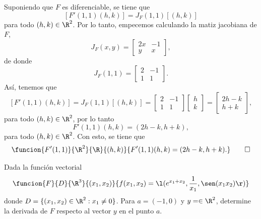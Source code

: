 \documentclass[a4,11pt]{aleph-examen}
\begin{document}
\begin{preguntas}
\begin{respuesta}
\begin{respuesta}
\begin{respuesta}
    Suponiendo que $F$ es diferenciable, se tiene que
    \[
        [F'(1,1)(h,k)] = J_F(1,1) [(h,k)]
    \]
    para todo $(h,k)\in\R^2$. Por lo tanto, empecemos calculando la matiz jacobiana de $F$,
    \[
        J_F(x,y)=
            \begin{bmatrix}
                2x  & -1\\
                y   & x
            \end{bmatrix},
    \]
    de donde
    \[
        J_F(1,1)=
            \begin{bmatrix}
                2  & -1\\
                1   & 1
            \end{bmatrix}.
    \]
    Así, tenemos que
    \[
        [F'(1,1)(h,k)] 
            = J_F(1,1) [(h,k)]
            = \begin{bmatrix}
                2  & -1\\
                1   & 1
            \end{bmatrix}
            \begin{bmatrix}
                h \\
                k 
            \end{bmatrix}
            = \begin{bmatrix}
                2h - k \\
                h + k 
            \end{bmatrix},
    \]
    para todo $(h,k)\in\R^2$, por lo tanto
    \[
        F'(1,1)(h,k) = (2h - k,h + k),
    \]
    para todo $(h,k)\in\R^2$. Con esto, se tiene que
    \[
        \funcion{F'(1,1)}{\R^2}{\R}{(h,k)}{F'(1,1)(h,k) = (2h - k,h + k).}
        \qedhere
    \]
\end{respuesta}



\item
    Dada la función vectorial 
    \[
        \funcion{F}{D}{\R^3}{(x_1,x_2)}{f(x_1,x_2)=\l(e^{x_1+x_2},\frac{1}{x_1},\sen(x_1x_2)\r)}
    \]
    donde $D=\{(x_1,x_2)\in\R^2:x_1\neq 0\}$. Para $a=(-1,0)$ y $y=\in\R^2$, determine la derivada de $F$ respecto al vector $y$ en el punto $a$.


\end{respuesta}
\end{respuesta}
\end{preguntas}
\end{document}
